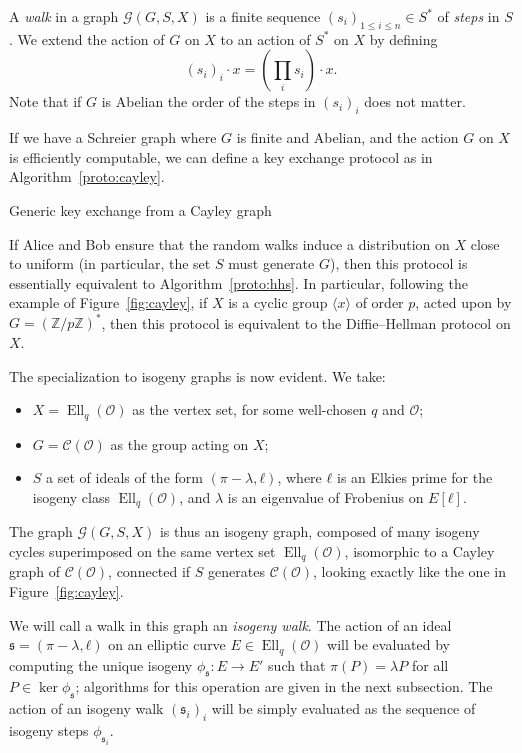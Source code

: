 \documentclass{article}
\newcommand{\Cl}{\mathcal{C}}
\newcommand{\Graph}{\mathcal{G}}
\renewcommand{\O}{\mathcal{O}}
\renewcommand{\frak}{\mathfrak}
\theoremstyle{definition}
\DeclareMathOperator{\Ell}{Ell}
\begin{document}
A \emph{walk} in a graph $\Graph(G,S,X)$ is a finite sequence
$(s_i)_{1≤i≤n}∈S^*$ of \emph{steps} in $S$. We extend the action of
$G$ on $X$ to an action of $S^*$ on $X$ by defining
\[(s_i)_i·x = \left(\prod_i s_i\right)·x.\] %
Note that if $G$ is Abelian the order of the steps in $(s_i)_i$ does
not matter.

If we have a Schreier graph where $G$ is finite and Abelian, and the
action $G$ on $X$ is efficiently computable, we can define a key
exchange protocol as in Algorithm~\ref{proto:cayley}.

\begin{algorithm}
  \caption{Generic key exchange from a Cayley graph}
  \label{proto:cayley}
\end{algorithm}

If Alice and Bob ensure that the random walks induce a distribution on
$X$ close to uniform (in particular, the set $S$ must generate $G$),
then this protocol is essentially equivalent to
Algorithm~\ref{proto:hhs}. In particular, following the example of
Figure~\ref{fig:cayley}, if $X$ is a cyclic group $〈x〉$ of order
$p$, acted upon by $G=(ℤ/pℤ)^*$, then this protocol is equivalent to
the Diffie--Hellman protocol on $X$.

The specialization to isogeny graphs is now evident. We take:
\begin{itemize}
\item $X=\Ell_q(\O)$ as the vertex set, for some well-chosen $q$ and $\O$;
\item $G=\Cl(\O)$ as the group acting on $X$;
\item $S$ a set of ideals of the form $(π-λ,ℓ)$, where $ℓ$ is an
  Elkies prime for the isogeny class $\Ell_q(\O)$,
  and $λ$ is an eigenvalue of Frobenius on $E[ℓ]$. 
\end{itemize}
The graph $\Graph(G,S,X)$ is thus an isogeny graph, composed of many
isogeny cycles superimposed on the same vertex set $\Ell_q(\O)$,
isomorphic to a Cayley graph of $\Cl(\O)$, connected if $S$ generates
$\Cl(\O)$, looking exactly like the one in Figure~\ref{fig:cayley}.

We will call a walk in this graph an \emph{isogeny walk}. The action of
an ideal $\frak s=(π-λ,ℓ)$ on an elliptic curve $E∈\Ell_q(\O)$ will be
evaluated by computing the unique isogeny $ϕ_{\frak s}:E→E'$ such that
$π(P)=λP$ for all $P∈\ker ϕ_{\frak s}$; algorithms for this operation are given
in the next subsection. The action of an isogeny walk $(\frak s_i)_i$
will be simply evaluated as the sequence of isogeny steps
$ϕ_{\frak s_i}$.
\end{document}
